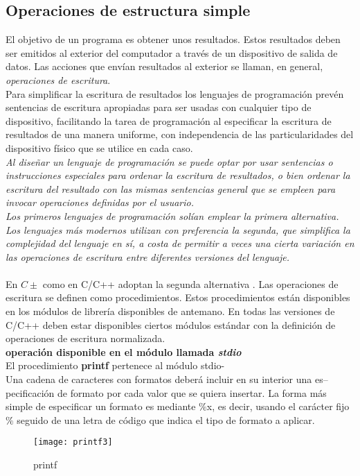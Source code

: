 \documentclass[11pt,a4paper]{article}
\begin{document}
	\subsection{Operaciones de estructura simple}
	El objetivo de un programa es obtener unos resultados. Estos resultados deben ser emitidos al exterior del computador a través de un dispositivo de salida de datos. Las acciones que envían resultados al exterior se llaman, en general, \textit{operaciones de escritura}.\\
	Para simplificar la escritura de resultados los 
	lenguajes de programación prevén sentencias de escritura apropiadas para ser usadas con cualquier tipo de dispositivo, facilitando la tarea de programación al especificar la escritura de resultados de una manera uniforme, con independencia de las particularidades del dispositivo físico que se utilice en cada caso.\\
	\textit{Al diseñar un lenguaje de programación se puede optar por usar sentencias o instrucciones especiales para ordenar la escritura de resultados, o bien ordenar la escritura del resultado con las mismas sentencias general que se empleen para invocar operaciones definidas por el usuario. \\ Los primeros lenguajes de programación solían emplear la primera alternativa. Los lenguajes más modernos utilizan con preferencia la segunda, que simplifica la complejidad del lenguaje en sí, a costa de permitir a veces una cierta variación en las 
	operaciones de escritura entre diferentes versiones del lenguaje.
	}\\
	\\
	En $C\pm$ como en C/C++ adoptan la segunda alternativa . Las operaciones de escritura se definen como procedimientos. Estos procedimientos están disponibles en los módulos de librería disponibles de antemano. En todas las versiones de C/C++ deben estar disponibles ciertos módulos estándar con la definición de operaciones de escritura normalizada. \\
	\textbf{operación disponible en el módulo llamada \textit{stdio}}\\
	El procedimiento \textbf{printf} pertenece al módulo stdio-\\
	Una cadena de caracteres con formatos deberá incluir en su interior una es--
	pecificación de formato por cada valor que se quiera insertar. La forma más 
	simple de especificar un formato es mediante $\% $x, es decir, usando el carácter fijo $\%$ seguido de una letra de código que indica el tipo de formato a aplicar.
		\begin{figure}[htb]
		\centering
		\texttt{[image: printf3]}
		\caption{printf}
		\label{fig:printf}
	\end{figure} 
\end{document}
